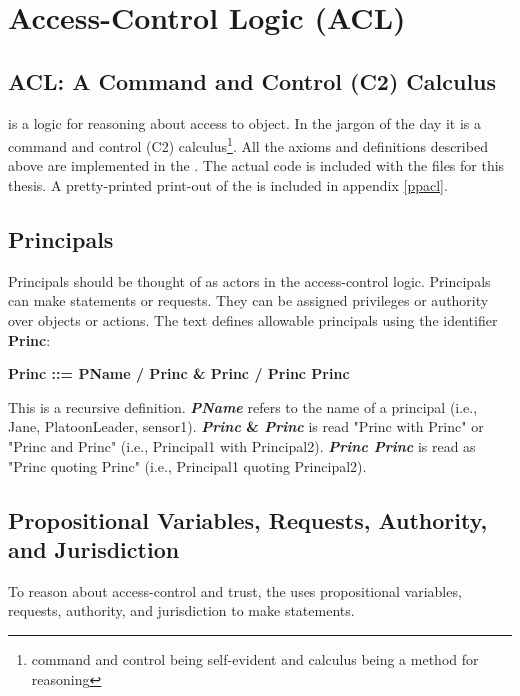 \documentclass[../../main/main.tex]{subfiles}
\begin{document}
\section{Access-Control Logic (ACL)} \label{sec:acl}

\subsection{ACL: A Command and Control (C2) Calculus} \label{ssec:aclc2}
 is a logic for reasoning about access to object.  In the jargon of the day it is a command and control (C2) calculus\footnote{command and control being self-evident and calculus being a method for reasoning}.  All the axioms and definitions described above are implemented in the .  The actual code is included with the files for this thesis.  A pretty-printed print-out of the  is included in appendix \ref{ppacl}.

\subsection{Principals}\label{ssec:principals}
Principals should be thought of as actors in the access-control logic.  Principals can make statements or requests.  They can be assigned privileges or authority over objects or actions.  The text defines allowable principals using the identifier \textbf{Princ}:


\begin{center}
\textbf{Princ ::= PName / Princ \& Princ / Princ \textbar  Princ}\label{Princ}
\end{center}

This is a recursive definition. \textbf{\textit{PName}} refers to the name of a principal (i.e., Jane, PlatoonLeader, sensor1).  \textbf{\textit{Princ} \& \textit{Princ}} is read "Princ with Princ" or "Princ and Princ" (i.e., Principal1 with Principal2). \textbf{\textit{Princ \textbar  Princ}} is read as "Princ quoting Princ" (i.e., Principal1 quoting Principal2).


\subsection{Propositional Variables, Requests, Authority, and Jurisdiction}\label{ssec:statementsacl}
To reason about access-control and trust, the  uses propositional variables, requests, authority, and jurisdiction to make statements.
\end{document}
